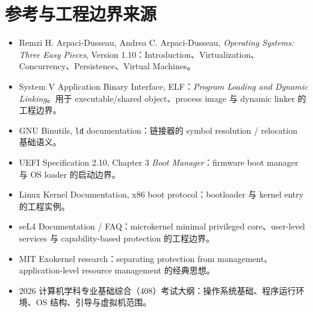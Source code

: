 \documentclass[11pt,a4paper]{ctexart}
\newcommand{\code}[1]{\texttt{#1}}
\begin{document}
\section*{参考与工程边界来源}
\begin{itemize}
  \item Remzi H. Arpaci-Dusseau, Andrea C. Arpaci-Dusseau, \emph{Operating Systems: Three Easy Pieces}, Version 1.10：Introduction、Virtualization、Concurrency、Persistence、Virtual Machines。
  \item System V Application Binary Interface, ELF：\emph{Program Loading and Dynamic Linking}。用于 executable/shared object、process image 与 dynamic linker 的工程边界。
  \item GNU Binutils, \code{ld} documentation：链接器的 symbol resolution / relocation 基础语义。
  \item UEFI Specification 2.10, Chapter 3 \emph{Boot Manager}：firmware boot manager 与 OS loader 的启动边界。
  \item Linux Kernel Documentation, x86 boot protocol：bootloader 与 kernel entry 的工程实例。
  \item seL4 Documentation / FAQ：microkernel minimal privileged core、user-level services 与 capability-based protection 的工程边界。
  \item MIT Exokernel research：separating protection from management、application-level resource management 的经典思想。
  \item 2026 计算机学科专业基础综合（408）考试大纲：操作系统基础、程序运行环境、OS 结构、引导与虚拟机范围。
\end{itemize}
\end{document}
